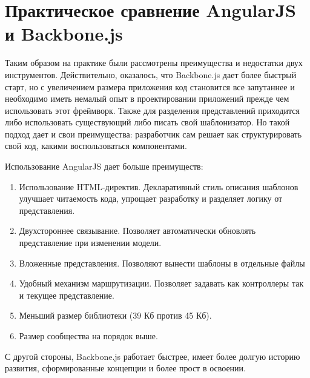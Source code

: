 \section{Практическое сравнение AngularJS и Backbone.js}

Таким образом на практике были рассмотрены преимущества и недостатки двух инструментов. Действительно, оказалось, что Backbone.js дает более быстрый старт, но с увеличением размера приложения код становится все запутаннее и необходимо иметь немалый опыт в проектировании приложений прежде чем использовать этот фреймворк. Также для разделения представлений приходится либо использовать существующий либо писать свой шаблонизатор. Но такой подход дает и свои преимущества: разработчик сам решает как структурировать свой код, какими воспользоваться компонентами.

Использование AngularJS дает больше преимуществ:
\begin{enumerate}
 \item Использование HTML-директив. Декларативный стиль описания шаблонов улучшает читаемость кода, упрощает разработку и разделяет логику от представления.
 \item Двухстороннее связывание. Позволяет автоматически обновлять представление при изменении модели.
 \item Вложенные представления. Позволяют вынести шаблоны в отдельные файлы
 \item Удобный механизм маршрутизации. Позволяет задавать как контроллеры так и текущее представление.
 \item Меньший размер библиотеки (39 Кб против 45 Кб).
 \item Размер сообщества на порядок выше\cite{angular}.
\end{enumerate}

С другой стороны, Backbone.js работает быстрее, имеет более долгую историю развития, сформированные концепции и более прост в освоении.